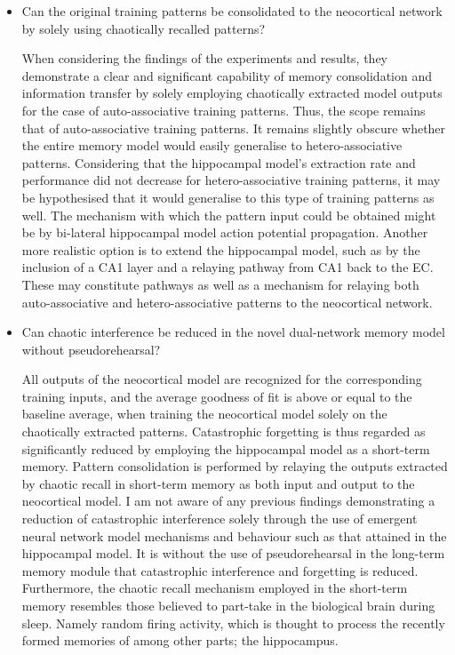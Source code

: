 \begin{itemize}
    \item Can the original training patterns be consolidated to the neocortical network by solely using chaotically recalled patterns?
    
    When considering the findings of the experiments and results, they demonstrate a clear and significant capability of memory consolidation and information transfer by solely employing chaotically extracted model outputs for the case of auto-associative training patterns. Thus, the scope remains that of auto-associative training patterns. It remains slightly obscure whether the entire memory model would easily generalise to hetero-associative patterns. Considering that the hippocampal model's extraction rate and performance did not decrease for hetero-associative training patterns, it may be hypothesised that it would generalise to this type of training patterns as well. The mechanism with which the pattern input could be obtained might be by bi-lateral hippocampal model action potential propagation. Another more realistic option is to extend the hippocampal model, such as by the inclusion of a CA1 layer and a relaying pathway from CA1 back to the EC. These may constitute pathways as well as a mechanism for relaying both auto-associative and hetero-associative patterns to the neocortical network.
    
    \item Can chaotic interference be reduced in the novel dual-network memory model without pseudorehearsal?
    
    All outputs of the neocortical model are recognized for the corresponding training inputs, and the average goodness of fit is above or equal to the baseline average, when training the neocortical model solely on the chaotically extracted patterns. Catastrophic forgetting is thus regarded as significantly reduced by employing the hippocampal model as a short-term memory. Pattern consolidation is performed by relaying the outputs extracted by chaotic recall in short-term memory as both input and output to the neocortical model. I am not aware of any previous findings demonstrating a reduction of catastrophic interference solely through the use of emergent neural network model mechanisms and behaviour such as that attained in the hippocampal model. It is without the use of pseudorehearsal in the long-term memory module that catastrophic interference and forgetting is reduced. Furthermore, the chaotic recall mechanism employed in the short-term memory resembles those believed to part-take in the biological brain during sleep. Namely random firing activity, which is thought to process the recently formed memories of among other parts; the hippocampus.
    
\end{itemize}

